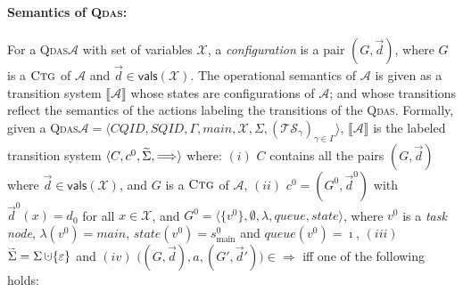 \documentclass[runningheads,oribibl,]{article}
\newcommand{\tuple}[1]{\langle#1\rangle\xspace}
\newcommand{\Aa}{\ensuremath{\mathcal{A}}\xspace}
\newcommand{\Ts}{\ensuremath{\mathcal{TS}}\xspace}
\newcommand{\Xx}{\ensuremath{\mathcal{X}}\xspace}
\newcommand{\e}{\ensuremath{\varepsilon}\xspace}
\newcommand{\sem}[1]{\ensuremath{\llbracket #1 \rrbracket}}
\DeclareMathOperator{\dotcup}{\mathaccent\cdot\cup}
\newcommand{\CQID}{CQID\xspace}
\newcommand{\SQID}{SQID\xspace}
\newcommand{\qdas}{\textsc{Qdas}\xspace}
\newcommand{\SSigma}{\ensuremath{\smash{\widetilde{\Sigma}}}}
\newcommand{\Graph}{\ensuremath{G}}
\newcommand{\Data}{\ensuremath{\vec{d}}}
\newcommand{\queue}{\ensuremath{\textit{queue}}}
\newcommand{\state}{\ensuremath{\textit{state}}}
\newcommand{\ctg}{\ensuremath{\textsc{Ctg}}\xspace}
\newcommand{\valof}[1]{\ensuremath{\mathsf{vals}\left(#1\right)}}
\begin{document}
\paragraph{\bf Semantics of \qdas:} For a \qdas $\Aa$ with set of variables
$\Xx$, a \emph{configuration} is a pair $(\Graph,\Data)$, where
$\Graph$ is a \ctg of $\Aa$ and $\Data\in\valof{\Xx}$.  The
operational semantics of $\Aa$ is given as a transition system
$\sem{\Aa}$ whose states are configurations of $\Aa$; and whose
transitions reflect the semantics of the actions labeling the
transitions of the \qdas. Formally, given a \qdas $\Aa=\tuple{\CQID,
  \SQID, \Gamma, main, \Xx, \Sigma, (\Ts_\gamma)_{\gamma\in\Gamma}}$,
$\sem{\Aa}$ is the labeled transition system $\langle C, c^0, \SSigma,
\Longrightarrow \rangle$ where: $(i)$ $C$ contains all the pairs
$(\Graph,\Data)$ where $\Data\in\valof{\Xx}$, and $\Graph$ is a \ctg
of $\Aa$, $(ii)$ $c^0=(\Graph^0,\Data^0)$ with $\Data^0(x)=d_0$ for
all $x\in\Xx$, and $\Graph^0=\tuple{\{v^0\},\emptyset,\lambda,
  \queue,\state}$, where $v^0$ is a \emph{task node},
$\lambda(v^0)=main$, $\state(v^0)=s^0_{\text{main}}$ and
$\queue(v^0)=\imath$, $(iii)$ $\SSigma=\Sigma\dotcup\{\e\}$ and $(iv)$
$\big((\Graph,\Data),a,(\Graph',\Data')\big)\in\Longrightarrow$ iff
one of the following holds:
\end{document}
